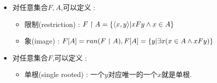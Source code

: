 {{{{\begin{itemize}
{\begin{itemize}
{                    证明 : \begin{math}
                      \forall\dependent{x,y}, \dependent{x,y} \in (R_1 \circ R_2) \circ R_3 \\
                      \Leftrightarrow \exists z (x R_3 z \land z(R_1 \circ R_2)y) \\
                      \Leftrightarrow \exists z (x R_3 z \land \exists t(z R_2 t \land t R_1 y)) \\
                      \Leftrightarrow \exists z \exists t(x R_3 z \land (z R_2 t \land t R_1 y)) \\
                      \Leftrightarrow \exists t \exists z(x R_3 z \land z R_2 t \land t R_1 y) \\
                      \Leftrightarrow \exists t \exists z (x R_3 z \land z R_2 t \land t R_1 y) \\
                      \Leftrightarrow \exists t(\exists z(x R_3 z \land z R_2 t) \land t R_1 y) \\
                      \Leftrightarrow \exists t(x(R_2 \circ R_3)t \land t R_1 y) \\
                      \Leftrightarrow x R_1 \circ (R_2 \circ R_3) y \\
                      \Leftrightarrow \dependent{x,y} \in R_1 \circ (R_2 \circ R_3) \\
                      \therefore (R_1 \circ R_2) \circ R_3 = R_1 \circ (R_2 \circ R_3)
                    \end{math}

                    \qed
                    }
            \end{itemize}
            }
      \item {
            对任意集合$F,A$,可以定义 :

            \begin{itemize}
              \item 限制(restriction) : $F \upharpoonright  A = \left\{ \langle x,y\rangle | xFy \land x \in A \right\}$
              \item 象(image) : $F[A] = ran(F \upharpoonright A),F[A] = \left\{ y | \exists x (x \in A \land xFy) \right\}$
            \end{itemize}
            }
      \item {
            对任意集合$F$,可以定义 :

            \begin{itemize}
              \item {
                    单根(single rooted) : 一个$y$对应唯一的一个$x$就是单根.

}
\end{itemize}}
\end{itemize}}}}}
